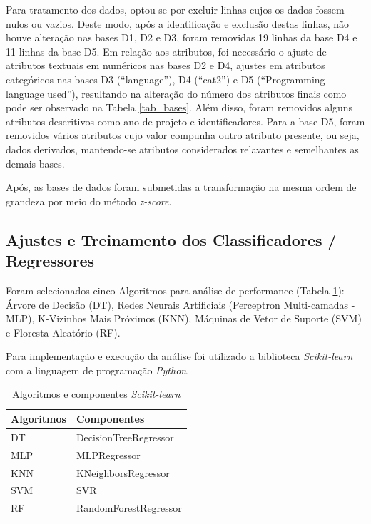 \documentclass[12pt]{article}
\begin{document}
Para tratamento dos dados, optou-se por excluir linhas cujos os dados fossem nulos ou vazios. Deste modo, após a identificação e exclusão destas linhas, não houve alteração nas bases D1, D2 e D3, foram removidas 19 linhas da base D4 e 11 linhas da base D5. Em relação aos atributos, foi necessário o ajuste de atributos textuais em numéricos nas bases D2 e D4, ajustes em atributos categóricos nas bases D3 (``language''), D4 (``cat2'') e D5 (``Programming language used''), resultando na alteração do número dos atributos finais como pode ser observado na Tabela \ref{tab_bases}. Além disso, foram removidos alguns atributos descritivos como ano de projeto e identificadores. Para a base D5, foram removidos vários atributos cujo valor compunha outro atributo presente, ou seja, dados derivados, mantendo-se atributos considerados relavantes e semelhantes as demais bases.

Após, as bases de dados foram submetidas a transformação na mesma ordem de grandeza por meio do método \textit{z-score}.

\subsection{Ajustes e Treinamento dos Classificadores / Regressores}
\label{treinamento}

Foram selecionados cinco Algoritmos para análise de performance (Tabela \ref{tab_algoritmos}): Árvore de Decisão (DT), Redes Neurais Artificiais (Perceptron Multi-camadas - MLP), K-Vizinhos Mais Próximos (KNN), Máquinas de Vetor de Suporte (SVM) e Floresta Aleatório (RF).

Para implementação e execução da análise foi utilizado a biblioteca \textit{Scikit-learn} \cite{scikitlearn:2011} com a linguagem de programação \textit{Python}.

\begin{table}[h!]
  \begin{center}
    \caption{Algoritmos e componentes \textit{Scikit-learn}}
    \label{tab_algoritmos}
    \begin{tabular}{l|l}
      \textbf{Algoritmos} & \textbf{Componentes}  \\
      \hline
      DT                  & DecisionTreeRegressor \\
      MLP                 & MLPRegressor          \\
      KNN                 & KNeighborsRegressor   \\
      SVM                 & SVR                   \\
      RF                  & RandomForestRegressor \\
    \end{tabular}
  \end{center}
\end{table}
\end{document}
